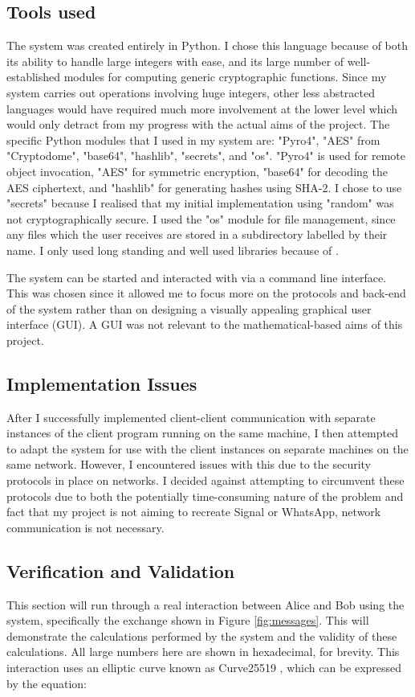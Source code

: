 \documentclass[12pt,a4paper]{article}
\begin{document}
\subsection{Tools used}\noindent \label{Tools}
The system was created entirely in Python. 
I chose this language because of both its ability to handle large integers with ease, 
and its large number of well-established modules for computing generic cryptographic functions. 
Since my system carries out operations involving huge integers, other less abstracted languages would 
have required much more involvement at the lower level which would only detract from my progress with the actual aims of the project. 
The specific Python modules that I used in my system are: "Pyro4", "AES" from "Cryptodome", "base64", "hashlib", "secrets", and "os". 
"Pyro4" is used for remote object invocation, "AES" for symmetric encryption, "base64" for decoding the AES ciphertext, 
and "hashlib" for generating hashes using SHA-2. 
I chose to use "secrets" because I realised that my initial implementation using "random" was not cryptographically secure. 
I used the "os" module for file management, since any files which the user receives are stored 
in a subdirectory labelled by their name. 
I only used long standing and well used libraries because of \cite{ducklin2021python}. 

The system can be started and interacted with via a command line interface. 
This was chosen since it allowed me to focus 
more on the protocols and back-end of the system rather than on designing a visually appealing graphical user interface (GUI). 
A GUI was not relevant to the mathematical-based aims of this project. 


\subsection{Implementation Issues}\noindent \label{Implementation}
After I successfully implemented client-client communication with separate instances of the client program running on the 
same machine, I then attempted to adapt the system for use with the client instances on separate machines on the same network. 
However, I encountered issues with this due to the security protocols in place on networks. 
I decided against attempting to circumvent these protocols due to both the potentially 
time-consuming nature of the problem and fact that my project is not aiming 
to recreate Signal or WhatsApp, network communication is not necessary. 


\subsection{Verification and Validation}\noindent \label{Verification}
This section will run through a real interaction between Alice and Bob using the system, 
specifically the exchange shown in Figure \ref{fig:messages}. 
This will demonstrate the calculations performed by the system and the validity of these calculations. 
All large numbers here are shown in hexadecimal, for brevity. 
This interaction uses an elliptic curve known as Curve25519 \cite{10.1007/11745853_14}, 
which can be expressed by the equation: 
\end{document}
